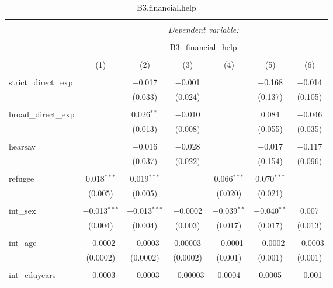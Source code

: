 
\begin{table}[H] \centering 
  \caption{B3.financial.help} 
  \label{} 
\tiny 
\begin{tabular}{@{\extracolsep{4pt}}lcccccc} 
\\[-1.8ex]\hline 
\hline \\[-1.8ex] 
 & \multicolumn{6}{c}{\textit{Dependent variable:}} \\ 
\cline{2-7} 
\\[-1.8ex] & \multicolumn{6}{c}{B3\_financial\_help} \\ 
\\[-1.8ex] & (1) & (2) & (3) & (4) & (5) & (6)\\ 
\hline \\[-1.8ex] 
 strict\_direct\_exp &  & $-$0.017 & $-$0.001 &  & $-$0.168 & $-$0.014 \\ 
  &  & (0.033) & (0.024) &  & (0.137) & (0.105) \\ 
  & & & & & & \\ 
 broad\_direct\_exp &  & 0.026$^{**}$ & $-$0.010 &  & 0.084 & $-$0.046 \\ 
  &  & (0.013) & (0.008) &  & (0.055) & (0.035) \\ 
  & & & & & & \\ 
 hearsay &  & $-$0.016 & $-$0.028 &  & $-$0.017 & $-$0.117 \\ 
  &  & (0.037) & (0.022) &  & (0.154) & (0.096) \\ 
  & & & & & & \\ 
 refugee & 0.018$^{***}$ & 0.019$^{***}$ &  & 0.066$^{***}$ & 0.070$^{***}$ &  \\ 
  & (0.005) & (0.005) &  & (0.020) & (0.021) &  \\ 
  & & & & & & \\ 
 int\_sex & $-$0.013$^{***}$ & $-$0.013$^{***}$ & $-$0.0002 & $-$0.039$^{**}$ & $-$0.040$^{**}$ & 0.007 \\ 
  & (0.004) & (0.004) & (0.003) & (0.017) & (0.017) & (0.013) \\ 
  & & & & & & \\ 
 int\_age & $-$0.0002 & $-$0.0003 & 0.00003 & $-$0.0001 & $-$0.0002 & $-$0.0003 \\ 
  & (0.0002) & (0.0002) & (0.0002) & (0.001) & (0.001) & (0.001) \\ 
  & & & & & & \\ 
 int\_eduyears & $-$0.0003 & $-$0.0003 & $-$0.00003 & 0.0004 & 0.0005 & $-$0.001 \\ 

\end{tabular}
\end{table}
